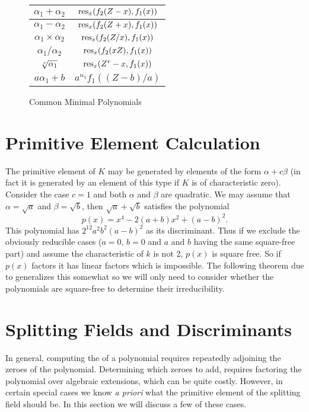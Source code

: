 \begin{figure}
\begin{center}
\begin{tabular}{|c|c|} \hline
$\alpha_1 + \alpha_2$ & $\mathop{\rm res}\nolimits_x(f_2(Z - x), f_1(x))$ \\[3pt] \hline
$\alpha_1 - \alpha_2$ & $\mathop{\rm res}\nolimits_x(f_2(Z + x), f_1(x))$ \\[3pt] \hline
$\alpha_1 \times \alpha_2$ & $\mathop{\rm res}\nolimits_x(f_2(Z/x), f_1(x))$ \\[3pt] \hline
$\alpha_1 / \alpha_2$ & $\mathop{\rm res}\nolimits_x(f_2(x Z), f_1(x))$ \\[3pt] \hline
$\root r \of{\alpha_1}$ & $\mathop{\rm res}\nolimits_x(Z^r - x, f_1(x))$ \\[3pt] \hline
$a \alpha_1 + b$ & $a^{n_1} f_1((Z - b)/a)$ \\[3pt] \hline
\end{tabular}
\end{center}
\caption{Common Minimal Polynomials \label{Minimal:Polynomial:Fig}}
\end{figure}


\section{Primitive Element Calculation}

The primitive element of $K$ may be generated by
elements of the form $\alpha + c \beta$ (in fact it is generated
by an element of this type if $K$ is of 
characteristic zero).  Consider the case $c = 1$ and both $\alpha$ and
$\beta$ are quadratic.  We may assume that $\alpha = \sqrt{a}$
and $\beta = \sqrt{b}$, then $\sqrt{a}+ \sqrt{b}$ satisfies
the polynomial
\[
p(x) = x^4 - 2 (a + b) x^2 + (a - b)^2.
\]
This polynomial has $2^{12} a^2 b^2 (a - b)^2$ as its discriminant.
Thus if we exclude the obviously reducible cases ($a = 0$, $b = 0$
and $a$ and $b$ having the same square-free part) and assume the
characteristic of $k$ is not 2, $p(x)$ is square free.
So if $p(x)$ factors it has linear factors which is impossible.
The following theorem due to {\Trager} generalizes this somewhat so we will 
only need to consider whether the polynomials are square-free to determine
their irreducibility.

\section{Splitting Fields and Discriminants}

In general, computing the  of a polynomial
requires repeatedly adjoining the zeroes of the polynomial.
Determining which zeroes to add, requires factoring the polynomial
over algebraic extensions, which can be quite costly.  However, in
certain special cases we know {\em a priori} what the primitive
element of the splitting field should be.  In this section we will
discuss a few of these cases.

